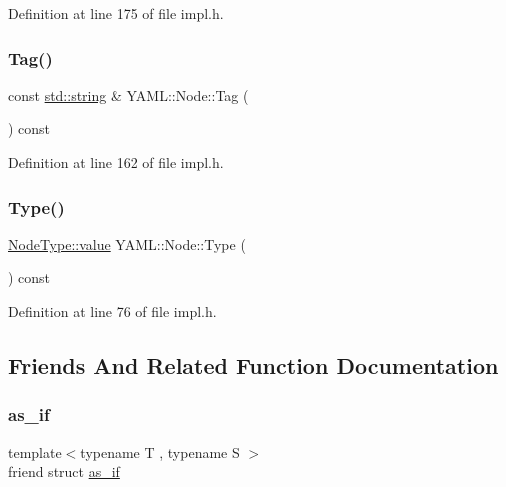 Definition at line 175 of file impl.\+h.

\mbox{\label{class_y_a_m_l_1_1_node_a58aaece650ba5da327f7ba3b2223d60c}} 
\subsubsection{\texorpdfstring{Tag()}{Tag()}}
{\footnotesize\ttfamily const \mbox{\hyperlink{glad_8h_ac83513893df92266f79a515488701770}{std\+::string}} \& Y\+A\+M\+L\+::\+Node\+::\+Tag (\begin{DoxyParamCaption}{ }\end{DoxyParamCaption}) const\hspace{0.3cm}{\ttfamily [inline]}}



Definition at line 162 of file impl.\+h.

\mbox{\label{class_y_a_m_l_1_1_node_a03ec765b519b11c1bdf9c050298a966d}} 
\subsubsection{\texorpdfstring{Type()}{Type()}}
{\footnotesize\ttfamily \mbox{\hyperlink{struct_y_a_m_l_1_1_node_type_af83cf3f3c2eca0bf0eae1bbf981e86c4}{Node\+Type\+::value}} Y\+A\+M\+L\+::\+Node\+::\+Type (\begin{DoxyParamCaption}{ }\end{DoxyParamCaption}) const\hspace{0.3cm}{\ttfamily [inline]}}



Definition at line 76 of file impl.\+h.



\subsection{Friends And Related Function Documentation}
\mbox{\label{class_y_a_m_l_1_1_node_aa5bd1397d82d2b3c48bbc0a5557de43f}} 
\subsubsection{\texorpdfstring{as\_if}{as\_if}}
{\footnotesize\ttfamily template$<$typename T , typename S $>$ \\
friend struct \mbox{\hyperlink{struct_y_a_m_l_1_1as__if}{as\+\_\+if}}\hspace{0.3cm}{\ttfamily [friend]}}



